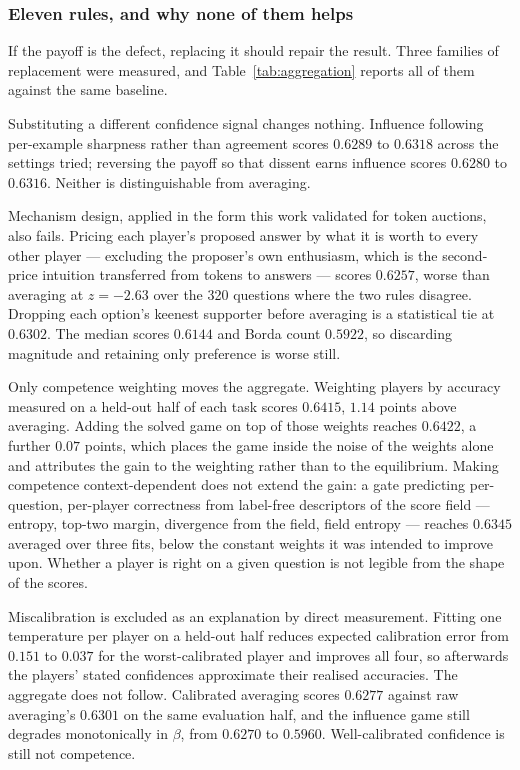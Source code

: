 \subsubsection{Eleven rules, and why none of them helps}

If the payoff is the defect, replacing it should repair the result. Three
families of replacement were measured, and Table~\ref{tab:aggregation} reports
all of them against the same baseline.

Substituting a different confidence signal changes nothing. Influence following
per-example sharpness rather than agreement scores $0.6289$ to $0.6318$ across
the settings tried; reversing the payoff so that dissent earns influence scores
$0.6280$ to $0.6316$. Neither is distinguishable from averaging.

Mechanism design, applied in the form this work validated for token auctions,
also fails. Pricing each player's proposed answer by what it is worth to every
other player --- excluding the proposer's own enthusiasm, which is the
second-price intuition transferred from tokens to answers --- scores $0.6257$,
worse than averaging at $z = -2.63$ over the 320 questions where the two rules
disagree. Dropping each option's keenest supporter before averaging is a
statistical tie at $0.6302$. The median scores $0.6144$ and Borda count $0.5922$,
so discarding magnitude and retaining only preference is worse still.

Only competence weighting moves the aggregate. Weighting players by accuracy
measured on a held-out half of each task scores $0.6415$, $1.14$ points above
averaging. Adding the solved game on top of those weights reaches $0.6422$, a
further $0.07$ points, which places the game inside the noise of the weights
alone and attributes the gain to the weighting rather than to the equilibrium.
Making competence context-dependent does not extend the gain: a gate predicting
per-question, per-player correctness from label-free descriptors of the score
field --- entropy, top-two margin, divergence from the field, field entropy ---
reaches $0.6345$ averaged over three fits, below the constant weights it was
intended to improve upon. Whether a player is right on a given question is not
legible from the shape of the scores.

Miscalibration is excluded as an explanation by direct measurement. Fitting one
temperature per player on a held-out half reduces expected calibration error from
$0.151$ to $0.037$ for the worst-calibrated player and improves all four, so
afterwards the players' stated confidences approximate their realised accuracies.
The aggregate does not follow. Calibrated averaging scores $0.6277$ against raw
averaging's $0.6301$ on the same evaluation half, and the influence game still
degrades monotonically in $\beta$, from $0.6270$ to $0.5960$. Well-calibrated
confidence is still not competence.

